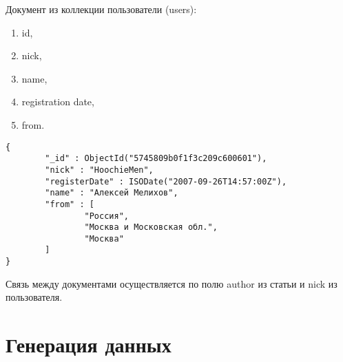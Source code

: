 \documentclass[a4paper]{article}
\begin{document}
Документ из коллекции пользователи (users):
\begin{enumerate}[noitemsep]
  \item id,
  \item nick,
  \item name,
  \item registration date,
  \item from.
\end{enumerate}
\begin{verbatim}
{
        "_id" : ObjectId("5745809b0f1f3c209c600601"),
        "nick" : "HoochieMen",
        "registerDate" : ISODate("2007-09-26T14:57:00Z"),
        "name" : "Алексей Мелихов",
        "from" : [
                "Россия",
                "Москва и Московская обл.",
                "Москва"
        ]
}
\end{verbatim}

Связь между документами осуществляется по полю author из статьи и nick из пользователя.
\section{Генерация данных}
\end{document}
